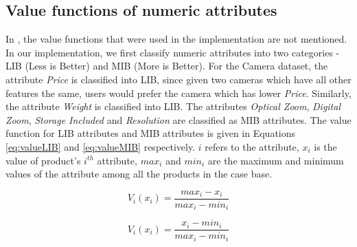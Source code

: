 \subsection{Value functions of numeric attributes}
In \cite{mautPaper}, the value functions that were used in the implementation are not mentioned.
In our implementation, we first classify numeric attributes into two categories - LIB (Less is Better) and MIB (More is Better).
For the Camera dataset, the attribute \textit{Price} is classified into LIB, since given two cameras which have all other features the same, users would prefer the camera which has lower \textit{Price}.
Similarly, the attribute \textit{Weight} is classified into LIB.
The attributes \textit{Optical Zoom}, \textit{Digital Zoom}, \textit{Storage Included} and \textit{Resolution} are classified as MIB attributes.
The value function for LIB attributes and MIB attributes is given in Equations \ref{eq:valueLIB} and \ref{eq:valueMIB} respectively. $i$ refers to the attribute, $x_i$ is the value of product's $i^{th}$ attribute, $max_i$ and $min_i$ are the maximum and minimum values of the attribute among all the products in the case base.

\begin{equation}
\label{eq:valueLIB}
V_i(x_i) =  \frac{max_i - x_i}{max_i - min_i}
\end{equation}

\begin{equation}
\label{eq:valueMIB}
V_i(x_i) =  \frac{x_i-min_i}{max_i - min_i}
\end{equation}


